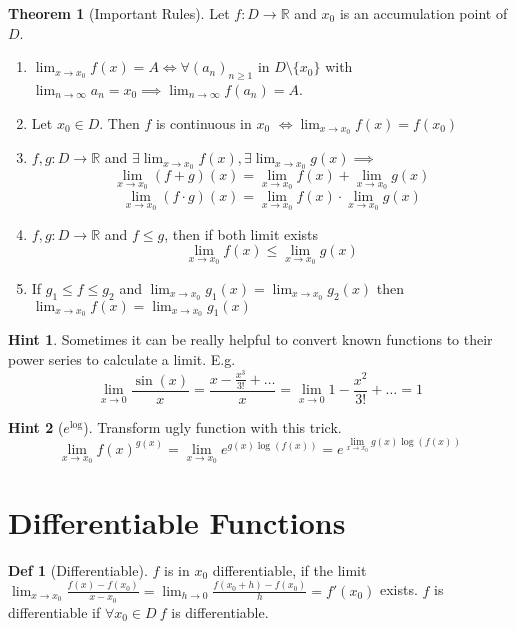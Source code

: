 \documentclass[a4paper, 10pt]{article}
\theoremstyle{definition}
\newtheorem*{definition}{Def}
\newtheorem*{note_wrapper}{Hint}
\theoremstyle{named}
\newtheorem*{ntheorem_wrapper}{Theorem}
\newenvironment{ntheorem}%
    {\begin{mdframed}[style=important]\begin{ntheorem_wrapper}}%
    {\end{ntheorem_wrapper}\end{mdframed}}
\newenvironment{note}%
    {\begin{mdframed}[style=trick]\begin{note_wrapper}}%
    {\end{note_wrapper}\end{mdframed}}
\newcommand{\R}{\mathbb{R}}
\begin{document}
\begin{ntheorem}[Important Rules]
    Let $f: D \to \R$ and $x_0$ is an accumulation point of $D$.
    \begin{enumerate}
        \item $\lim_{x \to x_0} f(x) = A \iff \forall (a_n)_{n \geq 1}$ in $D \setminus \{x_0\}$ with $\lim_{n \to \infty} a_n = x_0 \implies \lim_{n \to \infty} f(a_n) = A$.
        \item Let $x_0 \in D$. Then $f$ is continuous in $x_0$ \newline $\iff \lim_{x \to x_0} f(x) = f(x_0)$
        \item $f, g: D \to \R$ and $\exists \lim_{x \to x_0} f(x), \exists \lim_{x \to x_0} g(x) \implies$
        $$\lim_{x \to x_0} (f + g)(x) = \lim_{x \to x_0} f(x) + \lim_{x \to x_0} g(x)$$
        $$\lim_{x \to x_0} (f \cdot g) (x) = \lim_{x \to x_0}f(x) \cdot \lim_{x \to x_0} g(x)$$
        \item $f, g: D \to \R$ and $f \leq g$, then if both limit exists
        $$\lim_{x \to x_0} f(x) \leq \lim_{x \to x_0} g(x)$$ 
        \item If $g_1 \leq f \leq g_2$ and $\lim_{x \to x_0} g_1(x) = \lim_{x \to x_0} g_2(x)$ then $\lim_{x \to x_0} f(x) = \lim_{x \to x_0} g_1(x)$
    \end{enumerate}
\end{ntheorem}

\begin{note}
    Sometimes it can be really helpful to convert known functions to their power series to calculate a limit. E.g.
    $$\lim_{x \to 0} \frac{\sin(x)}{x} = \frac{x - \frac{x^3}{3!} + \ldots}{x} = \lim_{x \to 0} 1 - \frac{x^2}{3!} + \ldots = 1$$
\end{note}

\begin{note}[$e^{\log}$] Transform ugly function with this trick.
    $$\lim_{x \to x_0}f(x)^{g(x)} = \lim_{x \to x_0} e^{g(x)\log(f(x))} = e^{\lim\limits_{x \to x_0} g(x)\log(f(x))}$$
\end{note}

\section{Differentiable Functions}

\begin{definition}[Differentiable]
    $f$ is in $x_0$ differentiable, if the limit
    $\lim_{x \to x_0} \frac{f(x) - f(x_0)}{x - x_0} = \lim_{h \to 0} \frac{f(x_0 + h) - f(x_0)}{h} = f'(x_0)$ exists. $f$ is differentiable if $\forall x_0 \in D \ f$ is differentiable. 
\end{definition}
\end{document}
